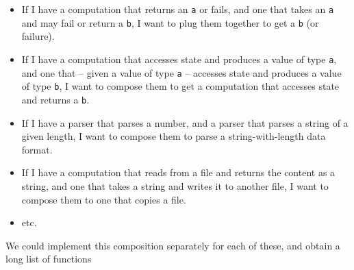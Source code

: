 \documentclass[11pt,
  american,
  DIV13]{article}
\providecommand{\tightlist}{%
  \setlength{\itemsep}{0pt}\setlength{\parskip}{0pt}}
\begin{document}
\begin{itemize}
\tightlist
\item
  If I have a computation that returns an \texttt{a} or fails, and one
  that takes an \texttt{a} and may fail or return a \texttt{b}, I want
  to plug them together to get a \texttt{b} (or failure).
\item
  If I have a computation that accesses state and produces a value of
  type \texttt{a}, and one that -- given a value of type \texttt{a} --
  accesses state and produces a value of type \texttt{b}, I want to
  compose them to get a computation that accesses state and returns a
  \texttt{b}.
\item
  If I have a parser that parses a number, and a parser that parses a
  string of a given length, I want to compose them to parse a
  string-with-length data format.
\item
  If I have a computation that reads from a file and returns the content
  as a string, and one that takes a string and writes it to another
  file, I want to compose them to one that copies a file.
\item
  etc.
\end{itemize}

We could implement this composition separately for each of these, and
obtain a long list of functions
\end{document}
